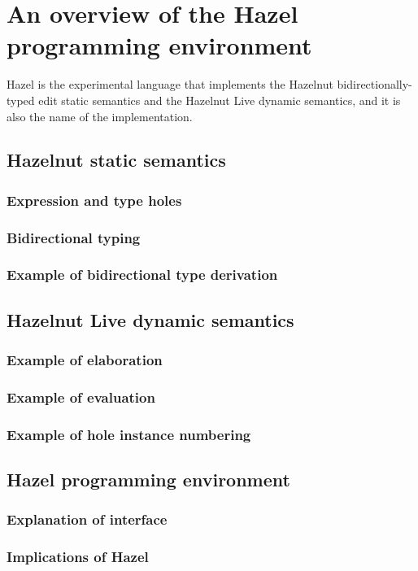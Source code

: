 \section{An overview of the Hazel programming environment}
\label{sec:hazel}

Hazel is the experimental language that implements the Hazelnut bidirectionally-typed edit static semantics and the Hazelnut Live dynamic semantics, and it is also the name of the implementation.

\subsection{Hazelnut static semantics}
\label{sec:statics}

\subsubsection{Expression and type holes}
\label{sec:holes}

\subsubsection{Bidirectional typing}
\label{sec:bidirectional_typing}

\subsubsection{Example of bidirectional type derivation}
\label{sec:typing_example}

\subsection{Hazelnut Live dynamic semantics}
\label{sec:dynamics}

\subsubsection{Example of elaboration}
\label{sec:elaboration_example}

\subsubsection{Example of evaluation}
\label{sec:evaluation_example}

\subsubsection{Example of hole instance numbering}
\label{sec:hole_instance_example}

\subsection{Hazel programming environment}
\label{sec:hazel_online}

\subsubsection{Explanation of interface}
\label{sec:hazel_interface}

\subsubsection{Implications of Hazel}
\label{sec:hazel_implications}

